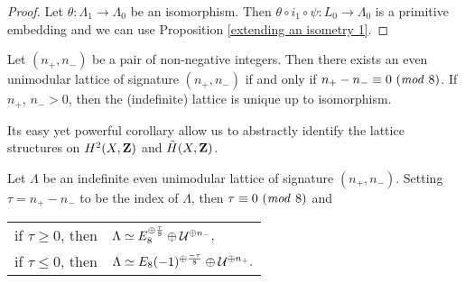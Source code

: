 \begin{proof}
    Let $\theta \colon \Lambda_1 \to \Lambda_0$ be an isomorphism. Then $\theta \circ i_1 \circ \psi \colon L_0 \to \Lambda_0$ is a primitive embedding and we can use Proposition \ref{extending an isometry 1}.
\end{proof}

\begin{theorem}
    \label{Milnor}
    Let $(n_+,n_-)$ be a pair of non-negative integers. Then there exists an even unimodular lattice of signature $(n_+, n_-)$ if and only if $n_+ - n_- \equiv 0 \ (\text{\emph{mod} }8)$. If $n_+$, $n_- > 0$, then the (indefinite) lattice is unique up to isomorphism.
\end{theorem}



Its easy yet powerful corollary allow us to abstractly identify the lattice structures on $H^{2}(X, \mathbf Z)$ and $\,\tilde{\!{H}}(X, \mathbf Z)$.

\begin{theorem}
    \label{Classification of indefinite even unimodular lattices}
    Let $\Lambda$ be an indefinite even unimodular lattice of signature $(n_+, n_-)$. Setting $\tau = n_+ - n_-$ to be the index of $\Lambda$, then $\tau \equiv 0 \ (\text{\emph{mod }}8)$ and
    \begin{center}
        \begin{tabular}{r l}
            if $\tau \geq 0$, then & $\Lambda \simeq E_8^{\oplus \frac{\tau}{8}} \oplus \mathcal U^{\oplus n_-},$ \\
            if $\tau \leq 0$, then & $\Lambda \simeq E_8(-1)^{\oplus \frac{-\tau}{8}} \oplus \mathcal U^{\oplus n_+}.$
        \end{tabular}
    \end{center}
\end{theorem}

